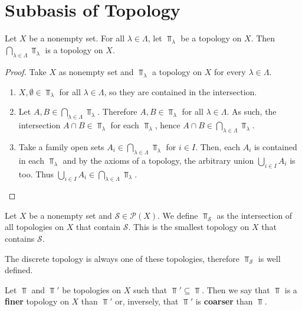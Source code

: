 \documentclass[../../main/main.tex]{subfiles}
\begin{document}
\section{Subbasis of Topology}
\label{sec:subbasis}

\begin{theorem}
  Let $X$ be a nonempty set. For all $\lambda \in \Lambda$, let $\Top_{\lambda}$ be a topology on $X$. Then
    $\bigcap_{\lambda \in \Lambda} \Top_{\lambda}$ is a topology on $X$.
\end{theorem}
\begin{proof}
  Take $X$ as nonempty set and $\Top_{\lambda}$ a topology on $X$ for every $\lambda \in \Lambda$.
  \begin{enumerate}
    \item $X, \emptyset \in \Top_{\lambda}$ for all $\lambda \in \Lambda$, so they are contained in the intersection.
    \item Let $A, B \in \bigcap_{\lambda \in \Lambda} \Top_{\lambda}$. Therefore $A, B \in \Top_{\lambda}$ for all $\lambda \in \Lambda$. As such, the intersection $A \cap B \in \Top_{\lambda}$ for each $\Top_{\lambda}$, hence $A\cap B \in \bigcap_{\lambda \in \Lambda} \Top_{\lambda}$.
    \item Take a family open sets $A_{i} \in \bigcap_{\lambda \in \Lambda} \Top_{\lambda}$ for $i \in I$. Then, each $A_{i}$ is contained in each $\Top_{\lambda}$ and by the axioms of a topology, the arbitrary union $\bigcup_{i \in I} A_{i}$ is too. Thus $\bigcup_{i \in I} A_{i} \in \bigcap_{\lambda \in \Lambda} \Top_{\lambda}$.
  \end{enumerate}
\end{proof}

\begin{definition}
  Let $X$ be a nonempty set and $\mathcal{S} \in \mathcal{P}(X)$. We define $\Top_{\mathcal{S}}$ as the intersection of all topologies on $X$ that contain $\mathcal{S}$. This is the smallest topology on $X$ that contains $\mathcal{S}$.
\end{definition}

\begin{remark}
  The discrete topology is always one of these topologies, therefore $\Top_{\mathcal{S}}$ is well defined.
\end{remark}

\begin{definition}
  Let $\Top$ and $\Top'$ be topologies on $X$ such that $\Top' \subseteq \Top$. Then we say that $\Top$ is a {\bf finer} topology on $X$ than $\Top'$ or, inversely, that $\Top'$ is {\bf coarser} than $\Top$.
\end{definition}
\end{document}
